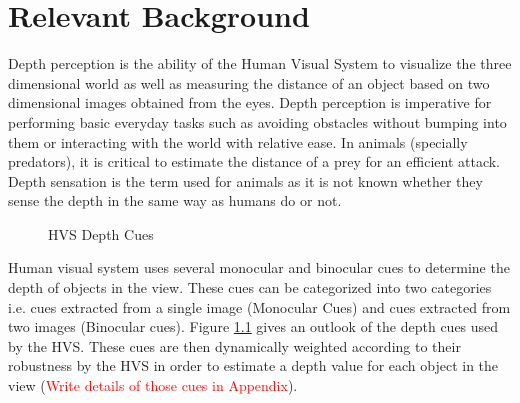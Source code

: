 \chapter{Relevant Background}
\label{chap:reletiveBackground}

Depth perception is the ability of the Human Visual System  to visualize the three dimensional world as well as measuring the distance of an object based on two dimensional images obtained from the eyes. Depth perception is imperative for performing basic everyday tasks such as avoiding obstacles without bumping into them or interacting with the world with relative ease. In animals (specially predators), it is critical to estimate the distance of a prey for an efficient attack. Depth sensation is the term used for animals as it is not known whether they sense the depth in the same way as humans do or not\cite{ wiki:depth_perception}.

\begin{figure}
\caption{HVS Depth Cues\label{fig:CueTree}}
\end{figure}

Human visual system  uses several monocular and binocular cues to determine the depth of objects in the view. These cues can be categorized into two categories i.e. cues extracted from a single image (Monocular Cues) and cues extracted from two images (Binocular cues)\cite{depthcues1}\cite{ wiki:depth_perception}. Figure \ref{fig:CueTree} gives an outlook of the depth cues used by the HVS. These cues are then dynamically weighted according to their robustness by the HVS in order to estimate a depth value for each object in the view \cite{CueFusion}(\textcolor{red}{Write details of those cues in Appendix}).



